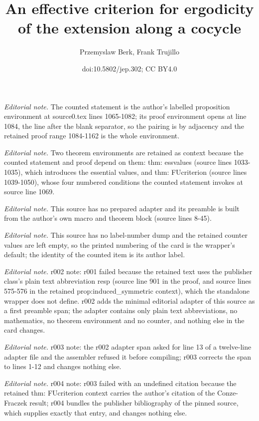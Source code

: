 \documentclass[10pt,a4paper]{article}
\title{An effective criterion for ergodicity of the extension along a cocycle}
\author{Przemyslaw Berk, Frank Trujillo}
\date{doi:10.5802/jep.302; CC BY4.0}
\theoremstyle{plain}
\theoremstyle{definition}
\begin{document}
\maketitle
\noindent\textit{Editorial note.} The counted statement is the author's labelled proposition environment at source0.tex lines 1065-1082; its proof environment opens at line 1084, the line after the blank separator, so the pairing is by adjacency and the retained proof range 1084-1162 is the whole environment.\par\medskip
\noindent\textit{Editorial note.} Two theorem environments are retained as context because the counted statement and proof depend on them: thm: essvalues (source lines 1033-1035), which introduces the essential values, and thm: FUcriterion (source lines 1039-1050), whose four numbered conditions the counted statement invokes at source line 1069.\par\medskip
\noindent\textit{Editorial note.} This source has no prepared adapter and its preamble is built from the author's own macro and theorem block (source lines 8-45).\par\medskip
\noindent\textit{Editorial note.} This source has no label-number dump and the retained counter values are left empty, so the printed numbering of the card is the wrapper's default; the identity of the counted item is its author label.\par\medskip
\noindent\textit{Editorial note.} r002 note: r001 failed because the retained text uses the publisher class's plain text abbreviation resp (source line 901 in the proof, and source lines 575-576 in the retained prop:induced\_symmetric context), which the standalone wrapper does not define. r002 adds the minimal editorial adapter of this source as a first preamble span; the adapter contains only plain text abbreviations, no mathematics, no theorem environment and no counter, and nothing else in the card changes.\par\medskip
\noindent\textit{Editorial note.} r003 note: the r002 adapter span asked for line 13 of a twelve-line adapter file and the assembler refused it before compiling; r003 corrects the span to lines 1-12 and changes nothing else.\par\medskip
\noindent\textit{Editorial note.} r004 note: r003 failed with an undefined citation because the retained thm: FUcriterion context carries the author's citation of the Conze-Fraczek result; r004 bundles the publisher bibliography of the pinned source, which supplies exactly that entry, and changes nothing else.\par\medskip
\end{document}
